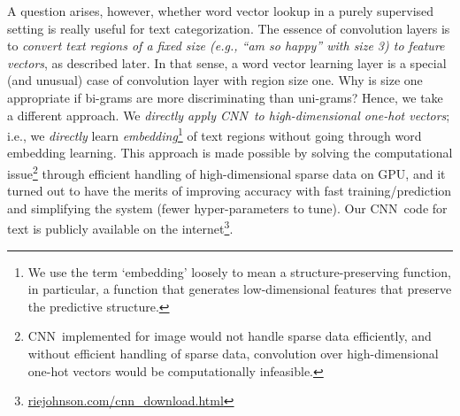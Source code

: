 \documentclass[11pt,letterpaper]{article}
\newcommand{\cnn}{CNN}
\begin{document}
A question arises, however, whether word vector lookup in a purely supervised setting 
is really useful for text categorization.  
The essence of convolution layers is to {\em convert text regions 
of a fixed size (e.g., ``am so happy'' with size 3) to feature vectors}, as described later. 
In that sense, a word vector learning layer is a special (and unusual) case of convolution layer with 
region size one.  
Why is size one appropriate if bi-grams are more discriminating than uni-grams? 
%
Hence, we take a different approach.  
We {\em directly apply \cnn\ to high-dimensional one-hot vectors};  
i.e., we {\em directly} learn {\em embedding}\footnote{
  We use the term `embedding' loosely to mean a structure-preserving function, 
  in particular, a function that generates low-dimensional features 
  that preserve the predictive structure. 
} of text regions without going through word embedding learning.  
This approach is made possible by solving the computational issue\footnote{
  \cnn\ implemented for image would not handle sparse data efficiently, and 
  without efficient handling of sparse data, 
  convolution over high-dimensional one-hot vectors would be computationally infeasible. 
}
through efficient handling of high-dimensional sparse data 
on GPU, and 
it turned out to have the merits of 
improving accuracy 
with fast training/prediction 
and simplifying the system (fewer hyper-parameters to tune).  
Our 
\cnn\ code for text is publicly available on the internet\footnote{
  \url{riejohnson.com/cnn_download.html}
}.  
\end{document}
